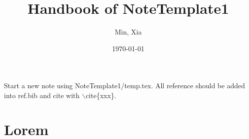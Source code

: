\documentclass[12pt, a4paper, oneside]{article}
\title{\textbf{Handbook of NoteTemplate1}}
\author{Min, Xia}
\date{\today}
\begin{document}
\maketitle
\setcounter{page}{1}
    Start a new note using NoteTemplate1/temp.tex. All reference should be added into ref.bib and cite with $\backslash$cite\{xxx\}.
    
\section{Lorem}
    \lipsum[1-10]
\end{document}
